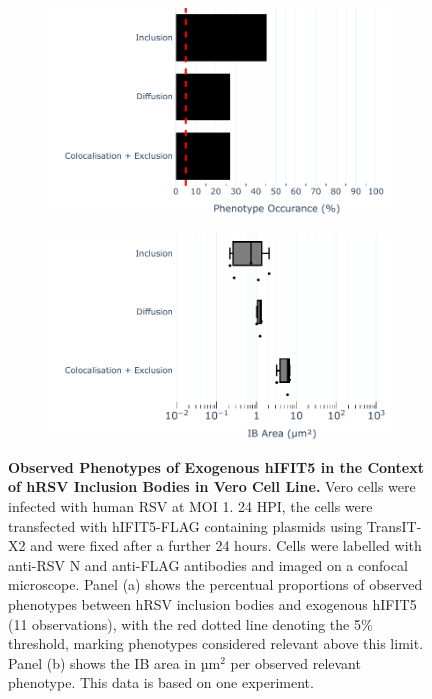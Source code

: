 \begin{figure}
    \begin{subfigure}{0.495\textwidth}
        \caption{}
        \includegraphics[width=1\linewidth]{09. Chapter 4/Figs/02. Overexpression/04. IFIT5/01. bar_i5_hrsv.pdf} 
    \end{subfigure}
    \begin{subfigure}{0.495\textwidth}
        \caption{}
        \includegraphics[width=1\linewidth]{09. Chapter 4/Figs/02. Overexpression/04. IFIT5/02. box_i5_hrsv.pdf}
    \end{subfigure}
    \caption[Observed Phenotypes of Exogenous hIFIT5 in the Context of hRSV Inclusion Bodies in Vero Cell Line.]{\textbf{Observed Phenotypes of Exogenous hIFIT5 in the Context of hRSV Inclusion Bodies in Vero Cell Line.} Vero cells were infected with human RSV at MOI 1. 24 HPI, the cells were transfected with hIFIT5-FLAG containing plasmids using TransIT-X2 and were fixed after a further 24 hours. Cells were labelled with anti-RSV N and anti-FLAG antibodies and imaged on a confocal microscope. Panel (a) shows the percentual proportions of observed phenotypes between hRSV inclusion bodies and exogenous hIFIT5 (11 observations), with the red dotted line denoting the 5\% threshold, marking phenotypes considered relevant above this limit. Panel (b) shows the IB area in \(\mbox{µm}^2\) per observed relevant phenotype. This data is based on one experiment.}
    \label{fig:Observed Phenotypes of Exogenous hIFIT5 in the Context of hRSV Inclusion Bodies in VERO Cell Line}
\end{figure}

